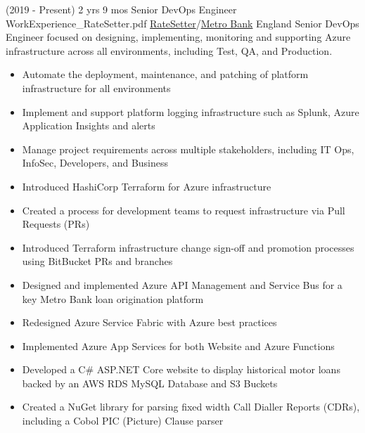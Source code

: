 
\begin{twenty}
\twentyitem
  {(2019 - Present) 2 yrs 9 mos}
  {Senior DevOps Engineer}
  {WorkExperience_RateSetter.pdf}
  {\href{https://www.ratesetter.com/}{RateSetter}/\href{https://metrobankonline.co.uk}{Metro Bank}}
  {England}
  {Senior DevOps Engineer focused on designing, implementing, monitoring and supporting Azure infrastructure across all environments, including Test, QA, and Production.}
  {\begin{itemize}
    \item Automate the deployment, maintenance, and patching of platform infrastructure for all environments
    \item Implement and support platform logging infrastructure such as Splunk, Azure Application Insights and alerts
    \item Manage project requirements across multiple stakeholders, including IT Ops, InfoSec, Developers, and Business
  \end{itemize}}
  {\begin{itemize}
    \item Introduced HashiCorp Terraform for Azure infrastructure
    \item Created a process for development teams to request infrastructure via Pull Requests (PRs)
    \item Introduced Terraform infrastructure change sign-off and promotion processes using BitBucket PRs and branches
    \item Designed and implemented Azure API Management and Service Bus for a key Metro Bank loan origination platform
    \item Redesigned Azure Service Fabric with Azure best practices
    \item Implemented Azure App Services for both Website and Azure Functions
    \item Developed a C\# ASP.NET Core website to display historical motor loans backed by an AWS RDS MySQL Database and S3 Buckets
    \item Created a NuGet library for parsing fixed width Call Dialler Reports (CDRs), including a Cobol PIC (Picture) Clause parser
  \end{itemize}
  }
\end{twenty}

